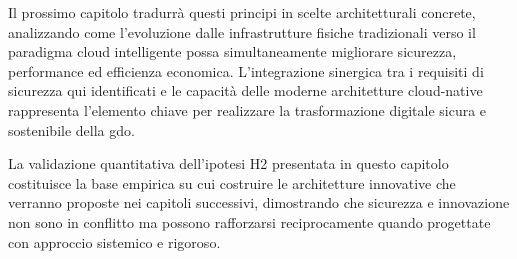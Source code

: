 Il prossimo capitolo tradurrà questi principi in scelte architetturali concrete, analizzando come l'evoluzione dalle infrastrutture fisiche tradizionali verso il paradigma cloud intelligente possa simultaneamente migliorare sicurezza, performance ed efficienza economica. L'integrazione sinergica tra i requisiti di sicurezza qui identificati e le capacità delle moderne architetture \gls{cloud-native} rappresenta l'elemento chiave per realizzare la trasformazione digitale sicura e sostenibile della \gls{gdo}.

La validazione quantitativa dell'ipotesi H2 presentata in questo capitolo costituisce la base empirica su cui costruire le architetture innovative che verranno proposte nei capitoli successivi, dimostrando che sicurezza e innovazione non sono in conflitto ma possono rafforzarsi reciprocamente quando progettate con approccio sistemico e rigoroso.





